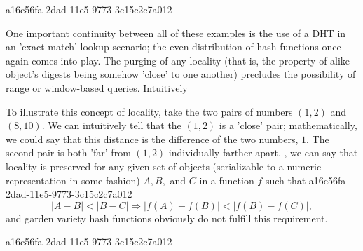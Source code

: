 \documentclass[12pt]{article}
\begin{document}
a16c56fa-2dad-11e5-9773-3c15c2c7a012\par One important continuity between all of these examples is the use of a DHT in an 'exact-match' lookup scenario; the even distribution of hash functions once again comes into play. The purging of any locality (that is, the property of alike object's digests being somehow 'close' to one another) precludes the possibility of range or window-based queries. Intuitively

\par To illustrate this concept of locality, take the two pairs of numbers $(1,2)$ and $(8,10)$. We can intuitively tell that the $(1,2)$ is a 'close' pair; mathematically, we could say that this distance is the difference of the two numbers, $1$. The second pair is both 'far' from $(1,2)$ individually farther apart. , we can say that locality is preserved for any given set of objects (serializable to a numeric representation in some fashion) $A,B,$ and $C$ in a function $f$ such that
a16c56fa-2dad-11e5-9773-3c15c2c7a012\begin{equation}
|A-B| < |B-C| \Rightarrow |f(A)-f(B)| < |f(B) - f(C)|,
\end{equation}
and garden variety hash functions obviously do not fulfill this requirement.

a16c56fa-2dad-11e5-9773-3c15c2c7a012\printbibliography
\end{document}
